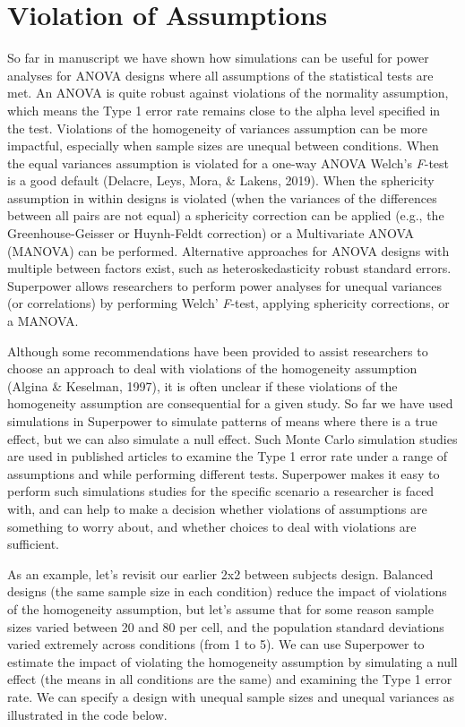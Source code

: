 \documentclass[
  english,
  ,jou,floatsintext]{apa6}
\begin{document}
\hypertarget{violation-of-assumptions}{%
\section{Violation of Assumptions}\label{violation-of-assumptions}}

So far in manuscript we have shown how simulations can be useful for power analyses for ANOVA designs where all assumptions of the statistical tests are met.
An ANOVA is quite robust against violations of the normality assumption, which means the Type 1 error rate remains close to the alpha level specified in the test. Violations of the homogeneity of variances assumption can be more impactful, especially when sample sizes are unequal between conditions.
When the equal variances assumption is violated for a one-way ANOVA Welch's \emph{F}-test is a good default (Delacre, Leys, Mora, \& Lakens, 2019).
When the sphericity assumption in within designs is violated (when the variances of the differences between all pairs are not equal) a sphericity correction can be applied (e.g., the Greenhouse-Geisser or Huynh-Feldt correction) or a Multivariate ANOVA (MANOVA) can be performed.
Alternative approaches for ANOVA designs with multiple between factors exist, such as heteroskedasticity robust standard errors.
Superpower allows researchers to perform power analyses for unequal variances (or correlations) by performing Welch' \emph{F}-test, applying sphericity corrections, or a MANOVA.

Although some recommendations have been provided to assist researchers to choose an approach to deal with violations of the homogeneity assumption (Algina \& Keselman, 1997), it is often unclear if these violations of the homogeneity assumption are consequential for a given study.
So far we have used simulations in Superpower to simulate patterns of means where there is a true effect, but we can also simulate a null effect.
Such Monte Carlo simulation studies are used in published articles to examine the Type 1 error rate under a range of assumptions and while performing different tests.
Superpower makes it easy to perform such simulations studies for the specific scenario a researcher is faced with, and can help to make a decision whether violations of assumptions are something to worry about, and whether choices to deal with violations are sufficient.

As an example, let's revisit our earlier 2x2 between subjects design.
Balanced designs (the same sample size in each condition) reduce the impact of violations of the homogeneity assumption, but let's assume that for some reason sample sizes varied between 20 and 80 per cell, and the population standard deviations varied extremely across conditions (from 1 to 5).
We can use Superpower to estimate the impact of violating the homogeneity assumption by simulating a null effect (the means in all conditions are the same) and examining the Type 1 error rate.
We can specify a design with unequal sample sizes and unequal variances as illustrated in the code below.
\end{document}
